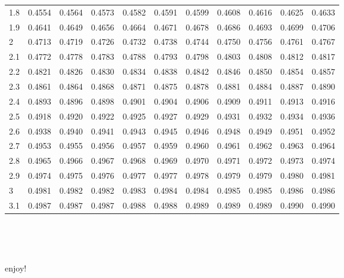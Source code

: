 \documentclass[]{tufte-handout}
\begin{document}
\begin{longtable}[]{@{}lrrrrrrrrrr@{}}
1.8 & 0.4554 & 0.4564 & 0.4573 & 0.4582 & 0.4591 & 0.4599 & 0.4608 &
0.4616 & 0.4625 & 0.4633 \\
1.9 & 0.4641 & 0.4649 & 0.4656 & 0.4664 & 0.4671 & 0.4678 & 0.4686 &
0.4693 & 0.4699 & 0.4706 \\
2 & 0.4713 & 0.4719 & 0.4726 & 0.4732 & 0.4738 & 0.4744 & 0.4750 &
0.4756 & 0.4761 & 0.4767 \\
2.1 & 0.4772 & 0.4778 & 0.4783 & 0.4788 & 0.4793 & 0.4798 & 0.4803 &
0.4808 & 0.4812 & 0.4817 \\
2.2 & 0.4821 & 0.4826 & 0.4830 & 0.4834 & 0.4838 & 0.4842 & 0.4846 &
0.4850 & 0.4854 & 0.4857 \\
2.3 & 0.4861 & 0.4864 & 0.4868 & 0.4871 & 0.4875 & 0.4878 & 0.4881 &
0.4884 & 0.4887 & 0.4890 \\
2.4 & 0.4893 & 0.4896 & 0.4898 & 0.4901 & 0.4904 & 0.4906 & 0.4909 &
0.4911 & 0.4913 & 0.4916 \\
2.5 & 0.4918 & 0.4920 & 0.4922 & 0.4925 & 0.4927 & 0.4929 & 0.4931 &
0.4932 & 0.4934 & 0.4936 \\
2.6 & 0.4938 & 0.4940 & 0.4941 & 0.4943 & 0.4945 & 0.4946 & 0.4948 &
0.4949 & 0.4951 & 0.4952 \\
2.7 & 0.4953 & 0.4955 & 0.4956 & 0.4957 & 0.4959 & 0.4960 & 0.4961 &
0.4962 & 0.4963 & 0.4964 \\
2.8 & 0.4965 & 0.4966 & 0.4967 & 0.4968 & 0.4969 & 0.4970 & 0.4971 &
0.4972 & 0.4973 & 0.4974 \\
2.9 & 0.4974 & 0.4975 & 0.4976 & 0.4977 & 0.4977 & 0.4978 & 0.4979 &
0.4979 & 0.4980 & 0.4981 \\
3 & 0.4981 & 0.4982 & 0.4982 & 0.4983 & 0.4984 & 0.4984 & 0.4985 &
0.4985 & 0.4986 & 0.4986 \\
3.1 & 0.4987 & 0.4987 & 0.4987 & 0.4988 & 0.4988 & 0.4989 & 0.4989 &
0.4989 & 0.4990 & 0.4990 \\
\bottomrule
\end{longtable}

　

　

enjoy!


\end{document}
